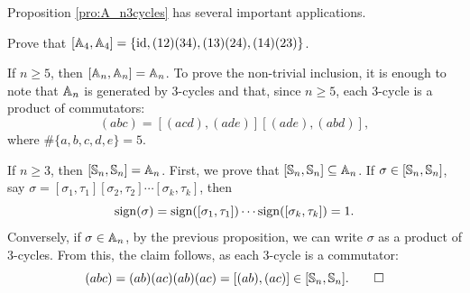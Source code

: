 Proposition \ref{pro:A_n3cycles} has several 
important applications. 

\begin{exercise}
\label{xca:commutator_A4}
    Prove that $[\mathbb{A}_4,\mathbb{A}_4]=\{\operatorname{id},(12)(34),(13)(24),(14)(23)\}$. 
\end{exercise}

\begin{example}
If $n\geq5$, then $[\mathbb{A}_n,\mathbb{A}_n]=\mathbb{A}_n$. To prove the non-trivial
inclusion, it is enough to note that $\mathbb{A}_n$ is generated by 
3-cycles and that, since $n\geq5$, each 3-cycle 
is a product of commutators: 
\[
(abc)=[(acd),(ade)][(ade),(abd)],
\]
where $\#\{a,b,c,d,e\}=5$.
\end{example}

\begin{example}
If $n\geq3$, then $[\mathbb{S}_n,\mathbb{S}_n]=\mathbb{A}_n$. First, we prove that $[\mathbb{S}_n,\mathbb{S}_n]\subseteq\mathbb{A}_n$. If 
$\sigma\in[\mathbb{S}_n,\mathbb{S}_n]$,
say $\sigma=[\sigma_1,\tau_1][\sigma_2,\tau_2]\cdots[\sigma_k,\tau_k]$, then
\[
\operatorname{sign}(\sigma)=\operatorname{sign}([\sigma_1,\tau_1])\cdots\operatorname{sign}([\sigma_k,\tau_k])=1.
\]
Conversely, if $\sigma\in\mathbb{A}_n$, by the previous proposition, 
we can write $\sigma$ as a product of 3-cycles. 
From this, the claim follows, as each 3-cycle is a commutator: 
\[
(abc)=(ab)(ac)(ab)(ac)=[(ab),(ac)]\in[\mathbb{S}_n,\mathbb{S}_n].\qedhere
\]
\end{example}

